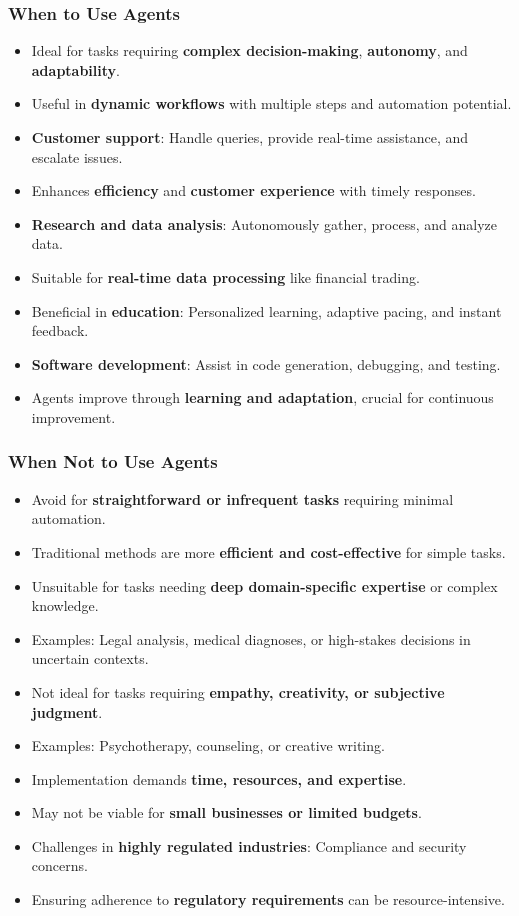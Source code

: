 \begin{frame}[fragile]\frametitle{When to Use Agents}
\begin{itemize}
    \item Ideal for tasks requiring \textbf{complex decision-making}, \textbf{autonomy}, and \textbf{adaptability}.
    \item Useful in \textbf{dynamic workflows} with multiple steps and automation potential.
    \item \textbf{Customer support}: Handle queries, provide real-time assistance, and escalate issues.
    \item Enhances \textbf{efficiency} and \textbf{customer experience} with timely responses.
    \item \textbf{Research and data analysis}: Autonomously gather, process, and analyze data.
    \item Suitable for \textbf{real-time data processing} like financial trading.
    \item Beneficial in \textbf{education}: Personalized learning, adaptive pacing, and instant feedback.
    \item \textbf{Software development}: Assist in code generation, debugging, and testing.
    \item Agents improve through \textbf{learning and adaptation}, crucial for continuous improvement.
\end{itemize}
\end{frame}

\begin{frame}[fragile]\frametitle{When Not to Use Agents}
\begin{itemize}
    \item Avoid for \textbf{straightforward or infrequent tasks} requiring minimal automation.
    \item Traditional methods are more \textbf{efficient and cost-effective} for simple tasks.
    \item Unsuitable for tasks needing \textbf{deep domain-specific expertise} or complex knowledge.
    \item Examples: Legal analysis, medical diagnoses, or high-stakes decisions in uncertain contexts.
    \item Not ideal for tasks requiring \textbf{empathy, creativity, or subjective judgment}.
    \item Examples: Psychotherapy, counseling, or creative writing.
    \item Implementation demands \textbf{time, resources, and expertise}.
    \item May not be viable for \textbf{small businesses or limited budgets}.
    \item Challenges in \textbf{highly regulated industries}: Compliance and security concerns.
    \item Ensuring adherence to \textbf{regulatory requirements} can be resource-intensive.
\end{itemize}
\end{frame}

